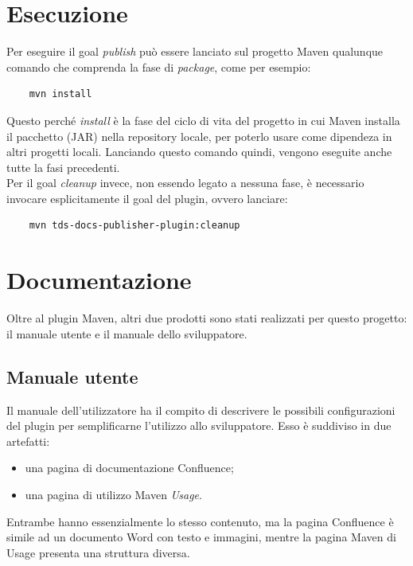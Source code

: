 \clearpage

\section{Esecuzione}    \label{secEsecuzione}
Per eseguire il goal \emph{publish} può essere lanciato sul progetto Maven qualunque comando che comprenda la fase di \emph{package}, come per esempio:
\begin{lstlisting} 
    mvn install
\end{lstlisting}
Questo perché \emph{install} è la fase del ciclo di vita del progetto in cui Maven installa il pacchetto (JAR) nella repository locale, per poterlo usare come dipendeza in altri progetti locali.
Lanciando questo comando quindi, vengono eseguite anche tutte la fasi precedenti.\\

Per il goal \emph{cleanup} invece, non essendo legato a nessuna fase, è necessario invocare esplicitamente il goal del plugin, ovvero lanciare:
\begin{lstlisting} 
    mvn tds-docs-publisher-plugin:cleanup
\end{lstlisting}


\section{Documentazione}    \label{secDocumentazione}
Oltre al plugin Maven, altri due prodotti sono stati realizzati per questo progetto: il manuale utente e il manuale dello sviluppatore.

    \subsection{Manuale utente}
    Il manuale dell'utilizzatore ha il compito di descrivere le possibili configurazioni del plugin per semplificarne l'utilizzo allo sviluppatore.
    Esso è suddiviso in due artefatti:
    \begin{itemize}
        \item una pagina di documentazione Confluence;
        \item una pagina di utilizzo Maven \emph{Usage}.
    \end{itemize}
    Entrambe hanno essenzialmente lo stesso contenuto, ma la pagina Confluence è simile ad un documento Word con testo e immagini, mentre la pagina Maven di Usage presenta una struttura diversa.

